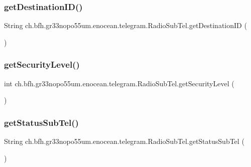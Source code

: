 \subsubsection{\texorpdfstring{get\+Destination\+I\+D()}{getDestinationID()}}
{\footnotesize\ttfamily String ch.\+bfh.\+gr33nopo55um.\+enocean.\+telegram.\+Radio\+Sub\+Tel.\+get\+Destination\+ID (\begin{DoxyParamCaption}{ }\end{DoxyParamCaption})}

\hypertarget{classch_1_1bfh_1_1gr33nopo55um_1_1enocean_1_1telegram_1_1_radio_sub_tel_aa5ce3c7c31de6d00e25d24396d522609}{}\label{classch_1_1bfh_1_1gr33nopo55um_1_1enocean_1_1telegram_1_1_radio_sub_tel_aa5ce3c7c31de6d00e25d24396d522609} 
\subsubsection{\texorpdfstring{get\+Security\+Level()}{getSecurityLevel()}}
{\footnotesize\ttfamily int ch.\+bfh.\+gr33nopo55um.\+enocean.\+telegram.\+Radio\+Sub\+Tel.\+get\+Security\+Level (\begin{DoxyParamCaption}{ }\end{DoxyParamCaption})}

\hypertarget{classch_1_1bfh_1_1gr33nopo55um_1_1enocean_1_1telegram_1_1_radio_sub_tel_ad79232ce0724cd2248c9473729278b65}{}\label{classch_1_1bfh_1_1gr33nopo55um_1_1enocean_1_1telegram_1_1_radio_sub_tel_ad79232ce0724cd2248c9473729278b65} 
\subsubsection{\texorpdfstring{get\+Status\+Sub\+Tel()}{getStatusSubTel()}}
{\footnotesize\ttfamily String ch.\+bfh.\+gr33nopo55um.\+enocean.\+telegram.\+Radio\+Sub\+Tel.\+get\+Status\+Sub\+Tel (\begin{DoxyParamCaption}{ }\end{DoxyParamCaption})}

